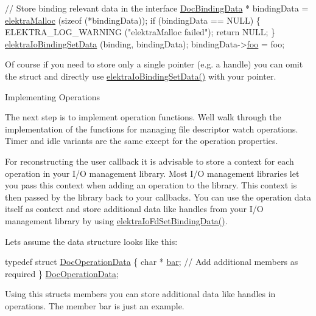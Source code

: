 \begin{DoxyCodeInclude}
        \textcolor{comment}{// Store binding relevant data in the interface}
        \hyperlink{structDocBindingData}{DocBindingData} * bindingData = \hyperlink{internal_8c_a35cdc2e5caed3454cb73b4fc7f37858c}{elektraMalloc} (\textcolor{keyword}{sizeof} (*bindingData));
        \textcolor{keywordflow}{if} (bindingData == NULL)
        \{
                ELEKTRA\_LOG\_WARNING (\textcolor{stringliteral}{"elektraMalloc failed"});
                \textcolor{keywordflow}{return} NULL;
        \}
        \hyperlink{io_8c_a6021718783b36ca71bb465bc08a682cc}{elektraIoBindingSetData} (binding, bindingData);
        bindingData->\hyperlink{structDocBindingData_ad3a3b6278b9d7287f923de0e6c3fa14d}{foo} = foo;
\end{DoxyCodeInclude}
 Of course if you need to store only a single pointer (e.\+g. a handle) you can omit the struct and directly use \hyperlink{io_8c_a6021718783b36ca71bb465bc08a682cc}{elektra\+Io\+Binding\+Set\+Data()} with your pointer.

\begin{DoxyParagraph}{Implementing Operations}

\end{DoxyParagraph}
The next step is to implement operation functions. We\textquotesingle{}ll walk through the implementation of the functions for managing file descriptor watch operations. Timer and idle variants are the same except for the operation properties.

For reconstructing the user callback it is advisable to store a context for each operation in your I/O management library. Most I/O management libraries let you pass this context when adding an operation to the library. This context is then passed by the library back to your callbacks. You can use the operation data itself as context and store additional data like handles from your I/O management library by using \hyperlink{io_8c_ae02ec122aafa67b7dd92d9c3daa6499e}{elektra\+Io\+Fd\+Set\+Binding\+Data()}.

Let\textquotesingle{}s assume the data structure looks like this\+:


\begin{DoxyCodeInclude}

\textcolor{keyword}{typedef} \textcolor{keyword}{struct }\hyperlink{structDocOperationData}{DocOperationData}
\{
        \textcolor{keywordtype}{char} * \hyperlink{structDocOperationData_aae15fddcc4a8c6e7a9faaebe4f9964ec}{bar};
        \textcolor{comment}{// Add additional members as required}
\} \hyperlink{io__doc_8c_a4a590fea95ee3e2ac9ca2623f2cec714}{DocOperationData};
\end{DoxyCodeInclude}
 Using this struct\textquotesingle{}s members you can store additional data like handles in operations. The member {\ttfamily bar} is just an example.

